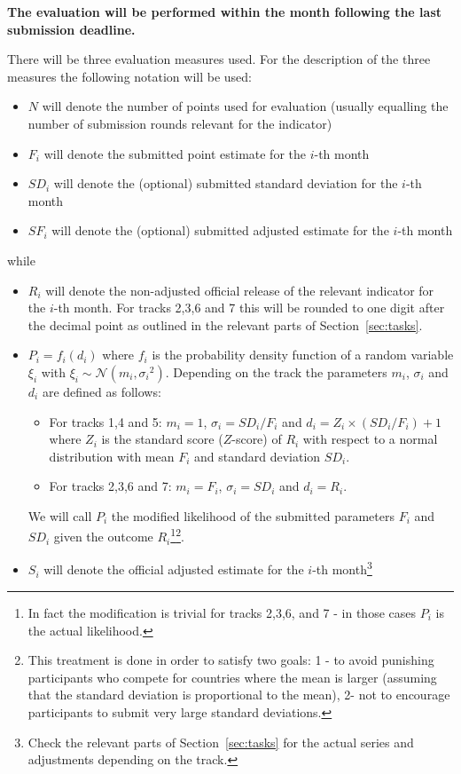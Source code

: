 \documentclass[12pt]{article}
\begin{document}
\textbf{The evaluation will be performed within the month following the last submission deadline.}

There will be three evaluation measures used. For the description of the three measures the following notation will be used:
\begin{itemize}
\item{$N$ will denote the number of points used for evaluation (usually equalling the number of submission rounds relevant for the indicator)}
\item{$F_i$ will denote the submitted point estimate for the $i$-th month}
\item{$SD_i$ will denote the (optional) submitted standard deviation for the $i$-th month}
\item{$SF_i$ will denote the (optional) submitted adjusted estimate for the $i$-th month}
\end{itemize}
while
\begin{itemize}
\item{$R_i$ will denote the non-adjusted official release of the relevant indicator for the $i$-th month. For tracks 2,3,6 and 7 this will be rounded to one digit after the decimal point as outlined in the relevant parts of Section~\ref{sec:tasks}}.
\item{$P_i=f_i(d_i)$ where $f_i$ is the probability density function of a random variable $\xi_i$ with $\xi_i \sim \mathcal{N}(m_i,{\sigma_i}^2)$. Depending on the track the parameters $m_i$, $\sigma_i$ and $d_i$ are defined as follows: 
    \begin{itemize}
    \item{For tracks 1,4 and 5: $m_i = 1$, $\sigma_i = SD_i/F_i$ and $d_i=Z_i\times(SD_i/F_i) +1$ where $Z_i$ is the standard score ($Z$-score) of $R_i$ with respect to a normal distribution with mean $F_i$ and standard deviation $SD_i$.}
    \item{For tracks 2,3,6 and 7: $m_i= F_i$, $\sigma_i=SD_i$ and $d_i=R_i$.}
    \end{itemize}
} 
We will call $P_i$ the modified likelihood of the submitted parameters $F_i$ and $SD_i$ given the outcome $R_i$\footnote{In fact the modification is trivial for tracks 2,3,6, and 7 - in those cases $P_i$ is the actual likelihood.}\footnote{This treatment is done in order to satisfy two goals: 1 - to avoid punishing participants who compete for countries where the mean is larger (assuming that the standard deviation is proportional to the mean), 2- not to encourage participants to submit very large standard deviations.}.
 
\item{$S_i$ will denote the official adjusted estimate for the $i$-th month\footnote{Check the relevant parts of Section~\ref{sec:tasks} for the actual series and adjustments depending on the track.}}
\end{itemize}
\end{document}
